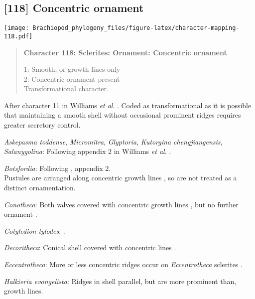 \documentclass[openany]{book}
\theoremstyle{definition}
\theoremstyle{definition}
\theoremstyle{definition}
\theoremstyle{remark}
\begin{document}
\subsection*{{[}118{]} Concentric ornament}\label{concentric-ornament}

\texttt{[image: Brachiopod\_phylogeny\_files/figure-latex/character-mapping-118.pdf]}

\begin{quote}
\textbf{Character 118: Sclerites: Ornament: Concentric ornament}

1: Smooth, or growth lines only\\
2: Concentric ornament present\\
Transformational character.
\end{quote}

After character 11 in Williams \emph{et al}.
\citeyearpar{Williams1998Thediversity}. Coded as transformational as it
is possible that maintaining a smooth shell without occasional prominent
ridges requires greater secretory control.

\hypertarget{Askepasma_toddense-coding-118}{}
\emph{Askepasma toddense}, \emph{Micromitra}, \emph{Glyptoria},
\emph{Kutorgina chengjiangensis}, \emph{Salanygolina}: Following
appendix 2 in Williams \emph{et al}.
\citeyearpar{Williams1998Thediversity}.

\hypertarget{Botsfordia-coding-118}{}
\emph{Botsfordia}: Following \citet{Williams1998Thediversity}, appendix
2.\\
Pustules are arranged along concentric growth lines
\citep{Skovsted2005EarlyCambrian}, so are not treated as a distinct
ornamentation.

\hypertarget{Conotheca-coding-118}{}
\emph{Conotheca}: Both valves covered with concentric growth lines
\citep{Devaere2014}, but no further ornament \citep{Wrona2003}.

\hypertarget{Cotyledion_tylodes-coding-118}{}
\emph{Cotyledion tylodes}: \citet{Zhang2013}.

\hypertarget{Decoritheca-coding-118}{}
\emph{Decoritheca}: Conical shell covered with concentric lines
\citep{Malinky1987}.

\hypertarget{Eccentrotheca-coding-118}{}
\emph{Eccentrotheca}: More or less concentric ridges occur on
\emph{Eccentrotheca} sclerites
\citep{Skovsted2011Scleritomeconstruction}.

\hypertarget{Halkieria_evangelista-coding-118}{}
\emph{Halkieria evangelista}: Ridges in shell parallel, but are more
prominent than, growth lines.
\end{document}

